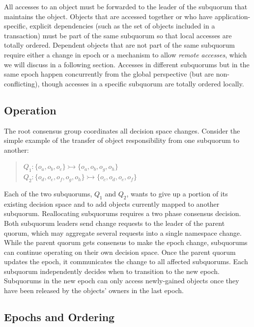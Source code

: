 \documentclass[sigconf]{acmart}
\begin{document}
All accesses to an object must be forwarded to the leader of the subquorum that maintains
the object.
Objects that are accessed together or who have application-specific, explicit
dependencies (such as the set of objects included in a transaction) must be part of the
same subquorum so that local accesses are totally ordered.
Dependent objects that are not part of the same subquorum require either a change in
epoch or a mechanism to allow \emph{remote accesses}, which we will discuss in a
following section.
Accesses in different subquorums but in the same epoch happen concurrently
from the global perspective (but are non-conflicting), though accesses in a
specific subquorum are totally ordered locally.

\subsection{Operation}

The root consensus group coordinates all decision space changes.
Consider the simple example of the transfer of object responsibility from one subquorum
to another:

\begin{quote}
\small
   $Q_1: \{o_a,o_b,o_c\} \rightarrowtail \{o_a,o_b,o_g,o_h\}$\\
   $Q_2: \{o_d,o_e,o_f,o_g,o_h\} \rightarrowtail \{o_c,o_d,o_e,o_f\}$
\end{quote}

Each of the two subquorums, $Q_1$ and $Q_2$, wants to give up a portion of its
existing decision space and to add objects currently mapped to another subquorum.
Reallocating subquorums requires a two phase consensus decision.
Both subquorum leaders send change requests to the leader of the parent quorum, which may
aggregate several requests into a single namespace change.
While the parent quorum gets consensus to make the epoch change, subquorums can continue
operating on their own decision space.
Once the parent quorum updates the epoch, it communicates the change to all affected
subquorums.
Each subquorum independently decides when to transition to the new epoch.
Subquorums in the new epoch can only access newly-gained objects once they have been
released by the objects' owners in the last epoch.

\subsection{Epochs and Ordering}
\end{document}
